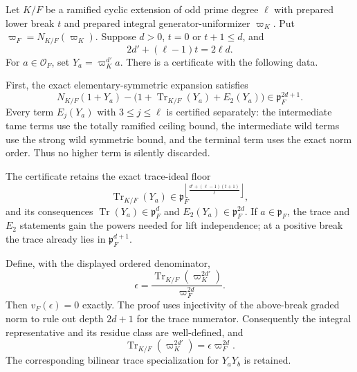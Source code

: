 \begin{theorem}
\label{mod:parameters-ramifiedhasselocalgeometry}
Let $K/F$ be a ramified cyclic extension of odd prime degree $\ell$ with
prepared lower break $t$ and prepared integral generator-uniformizer
$\varpi_K$.  Put $\varpi_F=N_{K/F}(\varpi_K)$.  Suppose $d>0$,
$t=0$ or $t+1\leq d$, and
\[
  2d'+(\ell-1)t=2\ell d.
\]
For $a\in\mathcal O_F$, set
$Y_a=\varpi_K^{d'}a$.  There is a certificate with the following data.

First, the exact elementary-symmetric expansion satisfies
\[
 N_{K/F}(1+Y_a)-\bigl(1+\operatorname{Tr}_{K/F}(Y_a)+E_2(Y_a)\bigr)
 \in\mathfrak p_F^{2d+1}.
\]
Every term $E_j(Y_a)$ with $3\leq j\leq\ell$ is certified separately:
the intermediate tame terms use the totally ramified ceiling bound, the
intermediate wild terms use the strong wild symmetric bound, and the terminal
term uses the exact norm order.  Thus no higher term is silently discarded.

The certificate retains the exact trace-ideal floor
\[
 \operatorname{Tr}_{K/F}(Y_a)\in
 \mathfrak p_F^{\left\lfloor
   \frac{d'+(\ell-1)(t+1)}{\ell}\right\rfloor},
\]
and its consequences $\operatorname{Tr}(Y_a)\in\mathfrak p_F^d$ and
$E_2(Y_a)\in\mathfrak p_F^{2d}$.  If $a\in\mathfrak p_F$, the trace and
$E_2$ statements gain the powers needed for lift independence; at a positive
break the trace already lies in $\mathfrak p_F^{d+1}$.

Define, with the displayed ordered denominator,
\[
 \epsilon=
 \frac{\operatorname{Tr}_{K/F}(\varpi_K^{2d'})}{\varpi_F^{2d}}.
\]
Then $v_F(\epsilon)=0$ exactly.  The proof uses injectivity of the
above-break graded norm to rule out depth $2d+1$ for the trace numerator.
Consequently the integral representative and its residue class are
well-defined, and
\[
 \operatorname{Tr}_{K/F}(\varpi_K^{2d'})
   =\epsilon\varpi_F^{2d}.
\]
The corresponding bilinear trace specialization for $Y_aY_b$ is retained.


\end{theorem}
